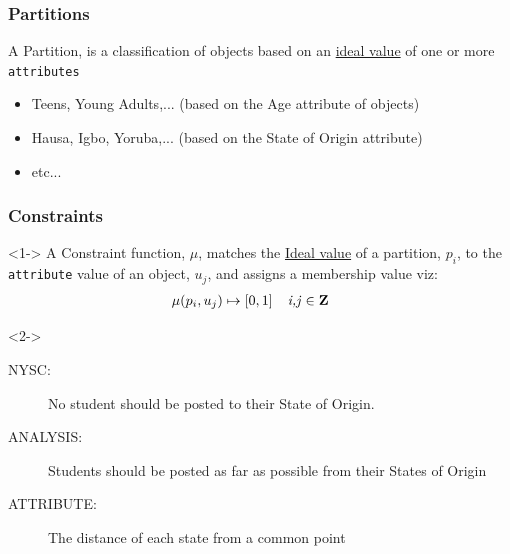 \documentclass[10pt]{beamer}
\begin{document}
			\begin{frame}
				\frametitle{Partitions}
				\begin{definition}
					A Partition, is a classification of objects based on an \underline{ideal value} of one or more \texttt{attributes}
				\end{definition}
				\begin{example}
					\begin{itemize}
						\item Teens, Young Adults,... (based on the Age attribute of objects)
						\item Hausa, Igbo, Yoruba,... (based on the State of Origin attribute)
						\item etc...
					\end{itemize}
				\end{example}
			\end{frame}

			\begin{frame}
				\frametitle{Constraints}
				\vfill
				\begin{definition}<1->
					A Constraint function, $\mu$, matches the \underline{Ideal value} of a partition, $p_i$, to the \texttt{attribute} value of an object, $u_j$, and assigns a membership value viz:
					\begin{align}
						\mu(p_i,u_j) &\mapsto [0,1] \textit{\ \ \  i,j $\in \mathbf{Z}$ }\notag
					\end{align}

				\end{definition}
				\vfill
				\begin{example}<2->
					\begin{description}
						\item [NYSC:] No student should be posted to their State of Origin.
						\item [ANALYSIS:] Students should be posted as far as possible from their States of Origin
						\item [ATTRIBUTE:] The distance of each state from a common point
					\end{description}
				\end{example}
			\end{frame}
\end{document}
